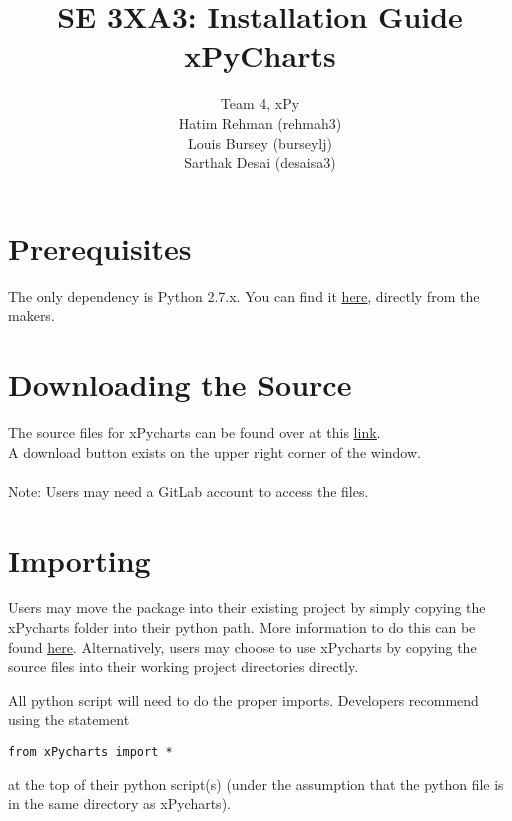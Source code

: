 \documentclass{article}
\begin{document}
\title{SE 3XA3: Installation Guide\\xPyCharts}

\author{Team 4, xPy
		\\ Hatim Rehman (rehmah3)
		\\ Louis Bursey (burseylj)
		\\ Sarthak Desai (desaisa3)
}

\date{}
\maketitle
\newpage

\section{Prerequisites}
The only dependency is Python 2.7.x. You can find it \href{https://www.python.org/downloads/}{\underline{here}}, directly from the makers.

\section{Downloading the Source} 
The source files for xPycharts can be found over at this \href{https://gitlab.cas.mcmaster.ca/rehmah3/XPYCharts_SE3XA3/tree/master/src} {\underline{link}}.\\ A download button exists on the upper right corner of the window. \\\\Note: Users may need a GitLab account to access the files.
\section{Importing}
Users may move the package into their existing project by simply copying the xPycharts folder into their python path. More information to do this can be found \href{http://stackoverflow.com/questions/3402168/permanently-add-a-directory-to-pythonpath}{\underline{here}}.
Alternatively, users may choose to use xPycharts by copying the source files into their working project directories directly. 

All python script will need to do the proper imports. Developers recommend using the statement
\begin{verbatim}
from xPycharts import *
\end{verbatim}
at the top of their python script(s) (under the assumption that the python file is in the same directory as xPycharts). 
\end{document}
